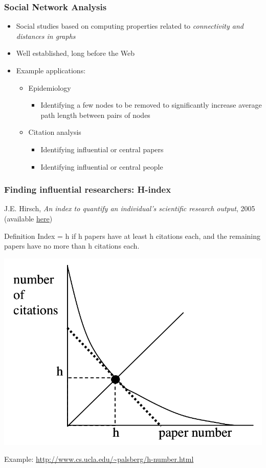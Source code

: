 \documentclass{beamer}
\begin{document}
\begin{frame}
  \frametitle{Social Network Analysis}

  \begin{itemize}
  \item Social studies based on computing properties related to \emph{connectivity and distances in graphs}
  \item Well established, long before the Web
  \item Example applications:
    \begin{itemize}
    \item Epidemiology
      \begin{itemize}
      \item Identifying a few nodes to be removed to significantly increase
        average path length between pairs of nodes
      \end{itemize}
    \item Citation analysis
      \begin{itemize}
      \item Identifying influential or central papers
      \item Identifying influential or central people
      \end{itemize}
    \end{itemize}
  \end{itemize}
  
\end{frame}


\begin{frame}
    \frametitle{Finding influential researchers: H-index}
    {\small J.E. Hirsch, \textit{An index to quantify an individual's
        scientific research output}, 2005 (available
      \href{http://www.cs.ucla.edu/~palsberg/hirsch05.pdf}{\underline{here}})}
    \begin{block}{Definition}
        Index = h if h papers have at least h citations each, and the remaining
        papers have no more than h citations each.
    \end{block}
    \begin{center}
        \includegraphics[width=.5\linewidth]{h-index}
    \end{center}
    \footnotesize Example: \url{http://www.cs.ucla.edu/~palsberg/h-number.html}
\end{frame}
\end{document}
